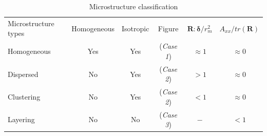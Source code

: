 \documentclass{sintefbeamer}
\begin{document}
\begin{frame}
\begin{figure}
\end{figure}
\begin{table}[h!]
  \caption{Microstructure classification}
  \label{tab:microstructure}
  \centering
  \begin{tabular}{|lccccc|} \hline
      Microstructure types & Homogeneous & Isotropic & Figure & $\textbf{R}:\bm\delta/r_m^2$ & $A_{xx}/tr(\textbf{R})$ \\
      Homogeneous & Yes & Yes &(\textit{Case 1}) & $ \approx 1$ & $\approx 0$ \\
      Dispersed &  No & Yes  &(\textit{Case 2}) & $ > 1$ & $\approx 0$ \\
      Clustering &  No & Yes  &(\textit{Case 2}) & $ < 1$ & $\approx 0$ \\
      Layering &    No & No  &(\textit{Case 3}) & $ - $ & $< 1$\\ \hline
  \end{tabular}
\end{table}

\end{frame}
\end{document}
